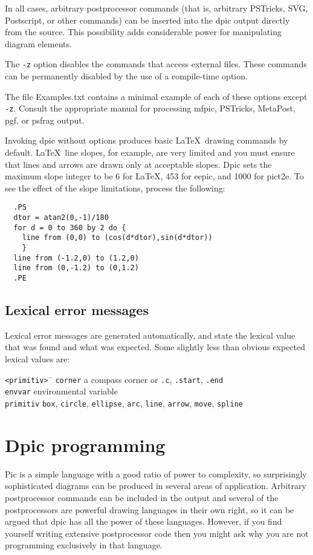 \documentclass[11pt]{article}
\newcommand{\bq}{}
\newcommand{\Dpic}{{\bq Dpic}\xspace}
\newcommand{\mfpic}{{\bq mfpic}\xspace}
\newcommand{\PSTricks}{{\bq PSTricks}\xspace}
\newcommand{\MetaPost}{{\bq MetaPost}\xspace}
\newcommand{\Postscript}{{\bq Postscript}\xspace}
\begin{document}
In all cases, arbitrary postprocessor commands (that is, arbitrary \PSTricks,
SVG, \Postscript, or other commands) can be inserted into the dpic output
directly from the source.
This possibility adds considerable power for manipulating diagram
elements.

The {\tt -z} option disables the commands that access external files.
These commands can be permanently disabled by the use of a compile-time
option.

The file Examples.txt contains a minimal example of each of these
options except {\tt -z}.  Consult the appropriate manual for processing
\mfpic, \PSTricks, \MetaPost, pgf, or psfrag output.

Invoking dpic without options produces basic \LaTeX\ drawing commands
by default.  \LaTeX\ line slopes, for example, are very limited and you
must ensure that lines and arrows are drawn only at acceptable slopes.
\Dpic sets the maximum slope integer to be 6 for \LaTeX, 453 for eepic,
and 1000 for pict2e.  To see the effect of the slope limitations,
process the following:
\begin{verbatim}
  .PS
  dtor = atan2(0,-1)/180
  for d = 0 to 360 by 2 do {
    line from (0,0) to (cos(d*dtor),sin(d*dtor))
    }
  line from (-1.2,0) to (1.2,0)
  line from (0,-1.2) to (0,1.2)
  .PE
\end{verbatim}


\subsection{Lexical error messages}
  Lexical error messages are generated automatically, and state the
lexical value that was found and what was expected.  Some
slightly less than obvious expected lexical values are:

\begin{tabbing}
\quad\=\hbox{\tt<primitiv>\ }\= \kill
\> {\tt corner} \> a compass corner or {\tt.c}, {\tt .start}, {\tt .end} \\
\> {\tt envvar} \> environmental variable \\
\> {\tt primitiv} \> {\tt box}, {\tt circle}, {\tt ellipse}, {\tt arc},
   {\tt line}, {\tt arrow}, {\tt move}, {\tt spline}
\end{tabbing}

\section{Dpic programming}
Pic is a simple language with a good ratio of power to complexity, so
surprisingly sophisticated diagrams can be produced in several areas of
application.
Arbitrary postprocessor commands can be included in the output and several
of the postprocessors are powerful drawing languages in their own
right, so it can be argued that dpic has all the power of these languages.
However, if you find yourself writing extensive postprocessor code then
you might ask why you are not programming exclusively in that language.
\end{document}
